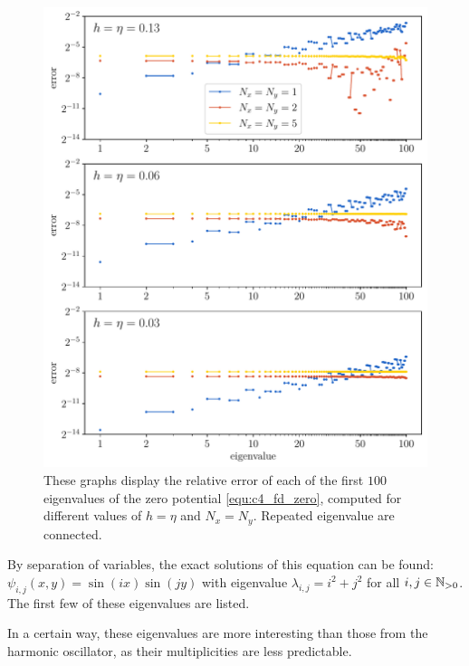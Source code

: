 \begin{figure}
    \begin{center}
        \includegraphics[width=\textwidth]{img/chapter4/fd_zero.pdf}
    \end{center}
    \caption{These graphs display the relative error of each of the first $100$ eigenvalues of the zero potential \eqref{equ:c4_fd_zero}, computed for different values of $h = \eta$ and $N_x = N_y$. Repeated eigenvalue are connected.}
    \label{fig:c4_fd_zero}
\end{figure}

By separation of variables, the exact solutions of this equation can be found: $\psi_{i, j}(x, y) = \sin(i x)\sin(j y)$ with eigenvalue $\lambda_{i,j} = i^2 + j^2$ for all $i, j \in \mathbb{N}_{>0}$. The first few of these eigenvalues are listed.

In a certain way, these eigenvalues are more interesting than those from the harmonic oscillator, as their multiplicities are less predictable.

